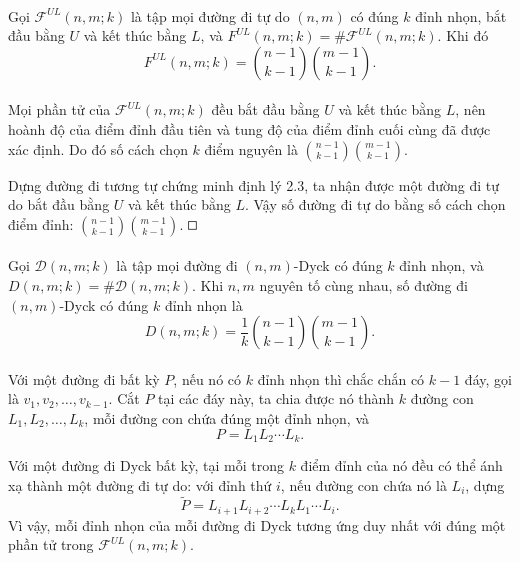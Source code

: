 \documentclass[11pt]{article}
\newcommand{\square}{\mathord{\vcenter{\hrule height .5pt
  \hbox{\vrule width .5pt height 5pt\kern5pt\vrule width .5pt}
  \hrule height .5pt}}}
\begin{document}
\paragraph{}
Gọi \(\mathcal F^{UL}(n,m;k)\) là tập mọi đường đi tự do \((n,m)\) có đúng
\(k\) đỉnh nhọn, bắt đầu bằng \(U\) và kết thúc bằng \(L\), và
\(F^{UL}(n,m;k)=\#\mathcal F^{UL}(n,m;k)\). Khi đó
\[
  F^{UL}(n,m;k)=\binom{n-1}{k-1}\binom{m-1}{k-1}. \tag{7}
\]

\paragraph{}
Mọi phần tử của \(\mathcal F^{UL}(n,m;k)\) đều bắt đầu bằng \(U\) và kết thúc
bằng \(L\), nên hoành độ của điểm đỉnh đầu tiên và tung độ của điểm đỉnh cuối
cùng đã được xác định. Do đó số cách chọn \(k\) điểm nguyên là
\(\binom{n-1}{k-1}\binom{m-1}{k-1}\).

Dựng đường đi tương tự chứng minh định lý 2.3, ta nhận được một đường đi tự
do bắt đầu bằng \(U\) và kết thúc bằng \(L\). Vậy số đường đi tự do bằng số
cách chọn điểm đỉnh:
\(\binom{n-1}{k-1}\binom{m-1}{k-1}\). \(\square\)

\paragraph{}
Gọi \(\mathcal D(n,m;k)\) là tập mọi đường đi \((n,m)\)-Dyck có đúng \(k\)
đỉnh nhọn, và \(D(n,m;k)=\#\mathcal D(n,m;k)\). Khi \(n,m\) nguyên tố cùng
nhau, số đường đi \((n,m)\)-Dyck có đúng \(k\) đỉnh nhọn là
\[
  D(n,m;k)=\frac1k\binom{n-1}{k-1}\binom{m-1}{k-1}. \tag{8}
\]

\paragraph{}
Với một đường đi bất kỳ \(P\), nếu nó có \(k\) đỉnh nhọn thì chắc chắn có
\(k-1\) đáy, gọi là \(v_1,v_2,\ldots,v_{k-1}\). Cắt \(P\) tại các đáy này, ta
chia được nó thành \(k\) đường con \(L_1,L_2,\ldots,L_k\), mỗi đường con chứa
đúng một đỉnh nhọn, và
\[
  P=L_1L_2\cdots L_k.
\]

Với một đường đi Dyck bất kỳ, tại mỗi trong \(k\) điểm đỉnh của nó đều có thể
ánh xạ thành một đường đi tự do: với đỉnh thứ \(i\), nếu đường con chứa nó là
\(L_i\), dựng
\[
  \widetilde P=L_{i+1}L_{i+2}\cdots L_kL_1\cdots L_i.
\]
Vì vậy, mỗi đỉnh nhọn của mỗi đường đi Dyck tương ứng duy nhất với đúng một
phần tử trong \(\mathcal F^{UL}(n,m;k)\).
\end{document}
